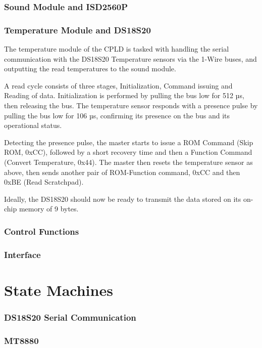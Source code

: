 \documentclass[a4paper,11pt]{article}
\begin{document}
		\subsubsection{Sound Module and ISD2560P}

		\subsubsection{Temperature Module and DS18S20}
			The temperature module of the CPLD is tasked with handling the serial communication with
			the DS18S20 Temperature sensors via the 1-Wire buses, and outputting the read temperatures
			to the sound module. 

			A read cycle consists of three stages, Initialization, Command issuing and Reading of data.
			Initialization is performed by pulling the bus low for 512 µs, then releasing the bus. The
			temperature sensor responds with a presence pulse by pulling the bus low for 106 µs, confirming
			its presence on the bus and its operational status. 

			Detecting the presence pulse, the master starts to issue a ROM Command (Skip ROM, 0xCC), followed
			by a short recovery time and then a Function Command (Convert Temperature, 0x44).
			The master then resets the temperature sensor as above, then sends another pair of ROM-Function 
			command, 0xCC and then 0xBE (Read Scratchpad).

			Ideally, the DS18S20 should now be ready to transmit the data stored on its on-chip memory of
			9 bytes.

		\subsubsection{Control Functions}

		\subsubsection{Interface}

\section{State Machines}
		\subsubsection{DS18S20 Serial Communication}
		\subsubsection{MT8880}
\end{document}

